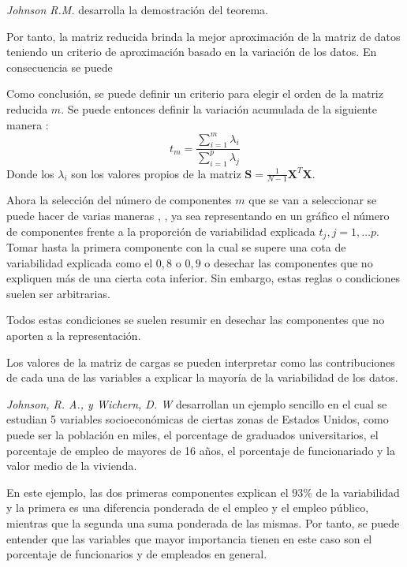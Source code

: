 \noindent \emph{Johnson R.M.} \cite{Johnson 1963} desarrolla la demostración del teorema. 

\noindent Por tanto, la matriz reducida brinda la mejor aproximación de la matriz de datos teniendo un criterio de aproximación basado en la variación de los datos. En consecuencia se puede 

\noindent Como conclusión, se puede definir un criterio para elegir el orden de la matriz reducida $m$. Se puede entonces definir la variación acumulada de la siguiente manera \cite{Chatfield 1989}:
\begin{equation}
t_m=\dfrac{\sum_{i=1}^{m}\lambda_i}{\sum_{i=1}^{p}\lambda_j}
\end{equation}
\noindent Donde los $\lambda_i$ son los valores propios de la matriz $\textbf{S}=\frac{1}{N-1}\textbf{X}^T\textbf{X}$.

\noindent Ahora la selección del número de componentes $m$ que se van a seleccionar se puede hacer de varias maneras \cite{Peña 2002}, \cite{Jollife 1986}, ya sea representando en un gráfico el número de componentes frente a la proporción de variabilidad explicada $t_j, j=1,\ldots p$. Tomar hasta la primera componente con la cual se supere una cota de variabilidad explicada como el $0,8$ o $0,9$ \cite {Jollife 1986} o desechar las componentes que no expliquen más de una cierta cota inferior. Sin embargo, estas reglas o condiciones suelen ser arbitrarias.

\noindent Todos estas condiciones se suelen resumir en desechar las componentes que no aporten a la representación. 

\noindent Los valores de la matriz de cargas se pueden interpretar como las contribuciones de cada una de las variables a explicar la mayoría de la variabilidad de los datos.

\noindent\emph{Johnson, R. A., y Wichern, D. W} \cite{Johnson 2007} desarrollan un ejemplo sencillo en el cual se estudian 5 variables socioeconómicas de ciertas zonas de Estados Unidos, como puede ser la población en miles, el porcentage de graduados universitarios, el porcentaje de empleo de mayores de 16 años, el porcentaje de funcionariado y la valor medio de la vivienda.

\noindent En este ejemplo, las dos primeras componentes explican el $93\%$ de la variabilidad y la primera es una diferencia ponderada de el empleo y el empleo público, mientras que la segunda una suma ponderada de las mismas. Por tanto, se puede entender que las variables que mayor importancia tienen en este caso son el porcentaje de funcionarios y de empleados en general.

